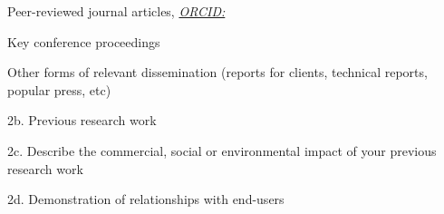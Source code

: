 \documentclass[a4paper,12pt]{article}
\begin{document}

    \begin{breakawaybox}{
    {Peer-reviewed journal articles, \href{https://orcid.org/\orcididnum}{\textit{ORCID:\orcididnum}}}
    }
        \printbibliography[heading=none, filter=peerreview]

    \end{breakawaybox}


    \begin{breakawaybox}{Key conference proceedings}
        \printbibliography[heading=none, filter=confrencepro]
    \end{breakawaybox}

    \begin{breakawaybox}{{Other forms of relevant dissemination (reports for clients, technical reports, popular press, etc)}}
        \printbibliography[heading=none, filter=reports]
    \end{breakawaybox}



    \begin{breakawaybox}{2b. Previous research work}
        
    \end{breakawaybox}

    \begin{breakawaybox}{{2c. Describe the commercial, social or environmental impact of your previous research work}}
        
    \end{breakawaybox}

    \begin{breakawaybox}{2d. Demonstration of relationships with end-users}
        
    \end{breakawaybox}
\end{document}
